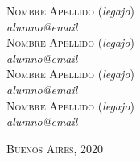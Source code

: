\begin{titlepage}
\begin{center} \large

\textsc{Nombre Apellido} (\emph{legajo}) \\%
\emph{alumno@email}\\[1cm]

\textsc{Nombre Apellido} (\emph{legajo}) \\%
\emph{alumno@email}\\[1cm]

\textsc{Nombre Apellido} (\emph{legajo}) \\%
\emph{alumno@email}\\[1cm]

\textsc{Nombre Apellido} (\emph{legajo}) \\%
\emph{alumno@email}\\[1cm]




\end{center}


\vfill %
\textsc{Buenos Aires,  \hspace*{\fill} 2020}




\end{titlepage}

\tableofcontents
\clearpage


\pagestyle{fancy} %
\lhead{} %
\rhead{} %
\cfoot{\thepage} %
\renewcommand{\headrulewidth}{0.4pt} %
\renewcommand{\footrulewidth}{0.4pt} %
\setlength{\headheight}{14.5pt}